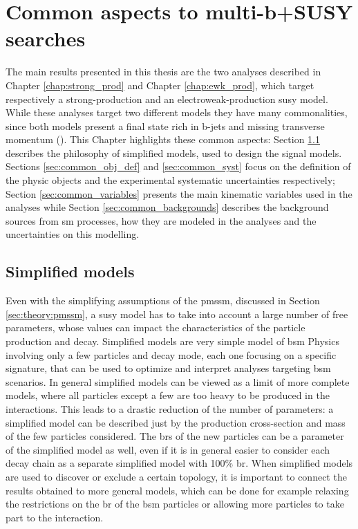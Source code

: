 \chapter{Common aspects to multi-b+\met SUSY searches}
\label{chap:multib_general}

The main results presented in this thesis are the two analyses described in Chapter \ref{chap:strong_prod} and Chapter \ref{chap:ewk_prod}, which target respectively a strong-production and an electroweak-production \gls{susy} model.
While these analyses target two different models they have many commonalities, since both models present a final state rich in b-jets and missing transverse momentum (\met). This Chapter highlights these common aspects: Section \ref{sec:simplified_models} describes the philosophy of simplified models, used to design the signal models. Sections \ref{sec:common_obj_def} and \ref{sec:common_syst} focus on the definition of the physic objects and the experimental systematic uncertainties respectively; Section \ref{sec:common_variables} presents the main kinematic variables used in the analyses while Section \ref{sec:common_backgrounds} describes the background sources from \gls{sm} processes, how they are modeled in the analyses and the uncertainties on this modelling. 

\section{Simplified models}
\label{sec:simplified_models}

Even with the simplifying assumptions of the \gls{pmssm}, discussed in Section \ref{sec:theory:pmssm}, a \gls{susy} model has to take into account a large number of free parameters, whose values can impact the characteristics of the particle production and decay. 
Simplified models \cite{Alves:2011wf} are very simple model of \gls{bsm} Physics involving only a few particles and decay mode, 
each one focusing on a specific signature, that can be used to optimize and interpret analyses targeting \gls{bsm} scenarios. 
In general simplified models can be viewed as a limit of more complete models, where all particles except a few are too heavy to be 
produced in the interactions. This leads to a drastic reduction of the number of parameters: a simplified model can be described just by the production cross-section and mass of the few particles considered. 
The \glspl{br} of the new particles can be a parameter of the simplified model as well, even if it is in general easier to consider each decay chain as a separate simplified model with 100\% \gls{br}.
When simplified models are used to discover or exclude a certain topology, it is important to connect the results obtained to more general models, 
which can be done for example relaxing the restrictions on the \gls{br} of the \gls{bsm} particles or allowing more particles to take part to the interaction.

